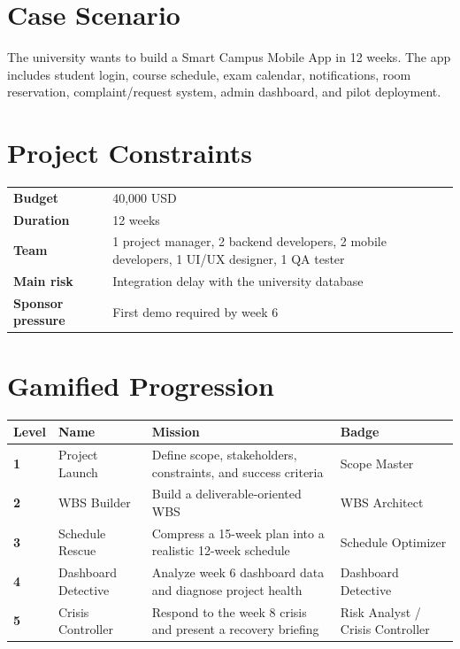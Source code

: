 \documentclass[11pt,a4paper]{article}
\begin{document}
\section*{Case Scenario}

The university wants to build a Smart Campus Mobile App in 12 weeks. The app includes student login, course schedule, exam calendar, notifications, room reservation, complaint/request system, admin dashboard, and pilot deployment.

\section*{Project Constraints}

\begin{tabular}{>{\bfseries}p{4cm}p{10.5cm}}
Budget & 40,000 USD \\
Duration & 12 weeks \\
Team & 1 project manager, 2 backend developers, 2 mobile developers, 1 UI/UX designer, 1 QA tester \\
Main risk & Integration delay with the university database \\
Sponsor pressure & First demo required by week 6 \\
\end{tabular}

\section*{Gamified Progression}

\begin{longtable}{>{\bfseries}p{1.6cm}p{3.2cm}p{5.2cm}p{3.4cm}}
\textbf{Level} & \textbf{Name} & \textbf{Mission} & \textbf{Badge} \\
\hline
1 & Project Launch & Define scope, stakeholders, constraints, and success criteria & Scope Master \\
2 & WBS Builder & Build a deliverable-oriented WBS & WBS Architect \\
3 & Schedule Rescue & Compress a 15-week plan into a realistic 12-week schedule & Schedule Optimizer \\
4 & Dashboard Detective & Analyze week 6 dashboard data and diagnose project health & Dashboard Detective \\
5 & Crisis Controller & Respond to the week 8 crisis and present a recovery briefing & Risk Analyst / Crisis Controller \\
\end{longtable}
\end{document}
